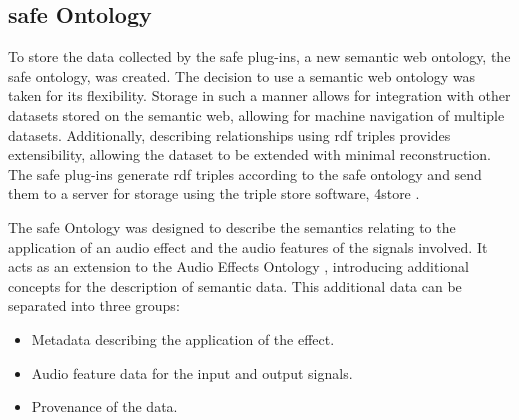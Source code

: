 	\subsection{\acrshort{safe} Ontology}
	\label{sec:TimbreEvaluation-DAWBasedTimbreEvaluation-SAFEOntology}
		To store the data collected by the \acrshort{safe} plug-ins, a new semantic web ontology, the
		\acrshort{safe} ontology, was created. The decision to use a semantic web ontology was taken for its
		flexibility. Storage in such a manner allows for integration with other datasets stored on the semantic
		web, allowing for machine navigation of multiple datasets. Additionally, describing relationships using
		\acrfull{rdf} triples provides extensibility, allowing the dataset to be extended
		with minimal reconstruction. The \acrshort{safe} plug-ins generate \acrshort{rdf} triples according to the
		\acrshort{safe} ontology and send them to a server for storage using the triple store software, 4store
		\citep{harris20094store}.
		
		The \acrshort{safe} Ontology was designed to describe the semantics relating to the application of an
		audio effect and the audio features of the signals involved. It acts as an extension to the Audio Effects
		Ontology \citep{wilmering2013the}, introducing additional concepts for the description of semantic data.
		This additional data can be separated into three groups:

		\begin{itemize}
			\item Metadata describing the application of the effect.
			\item Audio feature data for the input and output signals.
			\item Provenance of the data.
		\end{itemize}

